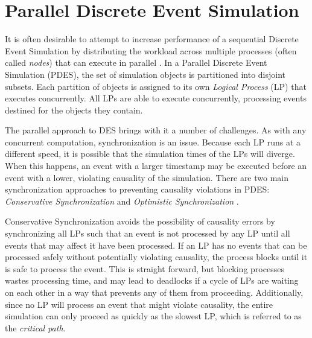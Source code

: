 \documentclass[11pt]{book}
\begin{document}
\section{Parallel Discrete Event Simulation}

It is often desirable to attempt to increase performance of a sequential Discrete Event Simulation by distributing the workload across multiple processes (often called \emph{nodes}) that can execute in parallel \cite{fujimoto-90}. In a Parallel Discrete Event Simulation (PDES), the set of simulation objects is partitioned into disjoint subsets. Each partition of objects is assigned to its own \emph{Logical Process} (LP) that executes concurrently. All LPs are able to execute concurrently, processing events destined for the objects they contain.

The parallel approach to DES brings with it a number of challenges. As with any concurrent computation, synchronization is an issue. Because each LP runs at a different speed, it is possible that the simulation times of the LPs will diverge. When this happens, an event with a larger timestamp may be executed before an event with a lower, violating causality of the simulation. There are two main synchronization approaches to preventing causality violations in PDES: \emph{Conservative Synchronization} \cite{bryant-79,chandy-81} and \emph{Optimistic Synchronization} \cite{fujimoto-90,jefferson-85}.

Conservative Synchronization avoids the possibility of causality errors by synchronizing all LPs such that an event is not processed by any LP until all events that may affect it have been processed. If an LP has no events that can be processed safely without potentially violating causality, the process blocks until it is safe to process the event. This is straight forward, but blocking processes wastes processing time, and may lead to deadlocks if a cycle of LPs are waiting on each other in a way that prevents any of them from proceeding. Additionally, since no LP will process an event that might violate causality, the entire simulation can only proceed as quickly as the slowest LP, which is referred to as the \emph{critical path}.
\end{document}
